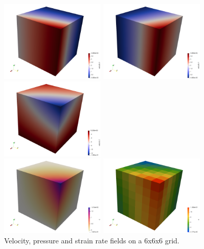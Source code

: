 \begin{center}
\includegraphics[width=5cm]{python_codes/fieldstone_17/results_isoviscous/u}
\includegraphics[width=5cm]{python_codes/fieldstone_17/results_isoviscous/v}
\includegraphics[width=5cm]{python_codes/fieldstone_17/results_isoviscous/w}\\
\includegraphics[width=5cm]{python_codes/fieldstone_17/results_isoviscous/pressure}
\includegraphics[width=5cm]{python_codes/fieldstone_17/results_isoviscous/sr}\\
{\captionfont Velocity, pressure and strain rate fields on a 6x6x6 grid.}
\end{center}


